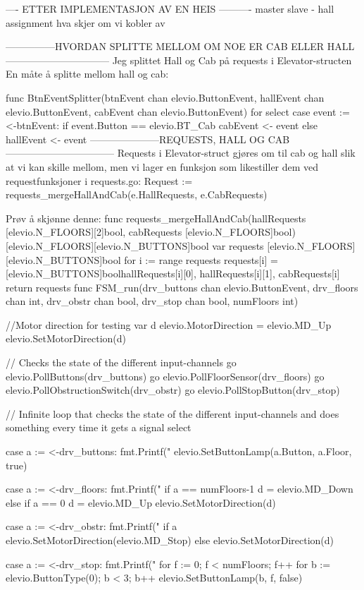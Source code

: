 
---- ETTER IMPLEMENTASJON AV EN HEIS ----------
master slave - hall assignment
hva skjer om vi kobler av


---------------HVORDAN SPLITTE MELLOM OM NOE ER CAB ELLER HALL--------------------------------
Jeg splittet Hall og Cab på requests i Elevator-structen
En måte å splitte mellom hall og cab:

func BtnEventSplitter(btnEvent chan elevio.ButtonEvent,
	hallEvent chan elevio.ButtonEvent,
	cabEvent chan elevio.ButtonEvent) {
	for {
		select {
		case event := <-btnEvent:
			if event.Button == elevio.BT_Cab {
				cabEvent <- event
			} else {
				hallEvent <- event
			}
		}
	}
}
---------------------REQUESTS, HALL OG CAB---------------------------------
Requests i Elevator-struct gjøres om til cab og hall slik at vi kan skille mellom, men vi lager en funksjon 
som likestiller dem ved requestfunksjoner i requests.go:
Request := requests_mergeHallAndCab(e.HallRequests, e.CabRequests)

Prøv å skjønne denne: 
func requests_mergeHallAndCab(hallRequests [elevio.N_FLOORS][2]bool, cabRequests [elevio.N_FLOORS]bool) [elevio.N_FLOORS][elevio.N_BUTTONS]bool {
	var requests [elevio.N_FLOORS][elevio.N_BUTTONS]bool
	for i := range requests {
		requests[i] = [elevio.N_BUTTONS]bool{hallRequests[i][0], hallRequests[i][1], cabRequests[i]}
	}
	return requests
}
func FSM_run(drv_buttons chan elevio.ButtonEvent, drv_floors chan int, drv_obstr chan bool, drv_stop chan bool, numFloors int) {

	//Motor direction for testing
	var d elevio.MotorDirection = elevio.MD_Up
	elevio.SetMotorDirection(d)


	// Checks the state of the different input-channels
	go elevio.PollButtons(drv_buttons)
	go elevio.PollFloorSensor(drv_floors)
	go elevio.PollObstructionSwitch(drv_obstr)
	go elevio.PollStopButton(drv_stop)

	// Infinite loop that checks the state of the different input-channels and does something every time it gets a signal
	select {
	case a := <-drv_buttons:
		fmt.Printf("%
		elevio.SetButtonLamp(a.Button, a.Floor, true)

	case a := <-drv_floors:
		fmt.Printf("%
		if a == numFloors-1 {
			d = elevio.MD_Down
		} else if a == 0 {
			d = elevio.MD_Up
		}
		elevio.SetMotorDirection(d)

	case a := <-drv_obstr:
		fmt.Printf("%
		if a {
			elevio.SetMotorDirection(elevio.MD_Stop)
		} else {
			elevio.SetMotorDirection(d)
		}

	case a := <-drv_stop:
		fmt.Printf("%
		for f := 0; f < numFloors; f++ {
			for b := elevio.ButtonType(0); b < 3; b++ {
				elevio.SetButtonLamp(b, f, false)
			}
		}
	}

}


